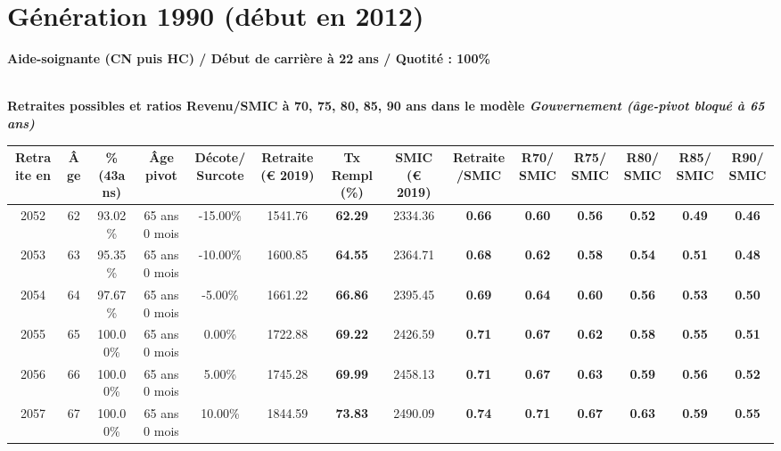 \newpage 
 
\section{Génération 1990 (début en 2012)\label{AideSoignant_100_1990_22_0}} 
 
{\bf \noindent Aide-soignante (CN puis HC) / Début de carrière à 22 ans / Quotité : 100\%}  ~ 

 ~\\{\bf \noindent Retraites possibles et ratios Revenu/SMIC à 70, 75, 80, 85, 90 ans dans le modèle \emph{Gouvernement (âge-pivot bloqué à 65 ans)}}  
 
\begin{adjustbox}{max width=\textwidth} 
\begin{tabular}[htb]{|c|c||c|c|c||c|c||c|c||c|c|c|c|c|} 
\hline 
 Retraite en &  Âge &  \%(43ans) &  Âge pivot &  Décote/Surcote &  Retraite (\euro{} 2019) &  Tx Rempl(\%) &  SMIC (\euro{} 2019) &  Retraite/SMIC &  R70/SMIC &  R75/SMIC &  R80/SMIC &  R85/SMIC &  R90/SMIC \\ 
\hline \hline 
 2052 &  62 &  93.02\% &  65 ans 0 mois &  -15.00\% &  1541.76 &  {\bf 62.29} &  2334.36 &  {\bf {\color{red} 0.66}} &  {\bf {\color{red} 0.60}} &  {\bf {\color{red} 0.56}} &  {\bf {\color{red} 0.52}} &  {\bf {\color{red} 0.49}} &  {\bf {\color{red} 0.46}} \\ 
\hline 
 2053 &  63 &  95.35\% &  65 ans 0 mois &  -10.00\% &  1600.85 &  {\bf 64.55} &  2364.71 &  {\bf {\color{red} 0.68}} &  {\bf {\color{red} 0.62}} &  {\bf {\color{red} 0.58}} &  {\bf {\color{red} 0.54}} &  {\bf {\color{red} 0.51}} &  {\bf {\color{red} 0.48}} \\ 
\hline 
 2054 &  64 &  97.67\% &  65 ans 0 mois &  -5.00\% &  1661.22 &  {\bf 66.86} &  2395.45 &  {\bf {\color{red} 0.69}} &  {\bf {\color{red} 0.64}} &  {\bf {\color{red} 0.60}} &  {\bf {\color{red} 0.56}} &  {\bf {\color{red} 0.53}} &  {\bf {\color{red} 0.50}} \\ 
\hline 
 2055 &  65 &  100.00\% &  65 ans 0 mois &  0.00\% &  1722.88 &  {\bf 69.22} &  2426.59 &  {\bf {\color{red} 0.71}} &  {\bf {\color{red} 0.67}} &  {\bf {\color{red} 0.62}} &  {\bf {\color{red} 0.58}} &  {\bf {\color{red} 0.55}} &  {\bf {\color{red} 0.51}} \\ 
\hline 
 2056 &  66 &  100.00\% &  65 ans 0 mois &  5.00\% &  1745.28 &  {\bf 69.99} &  2458.13 &  {\bf {\color{red} 0.71}} &  {\bf {\color{red} 0.67}} &  {\bf {\color{red} 0.63}} &  {\bf {\color{red} 0.59}} &  {\bf {\color{red} 0.56}} &  {\bf {\color{red} 0.52}} \\ 
\hline 
 2057 &  67 &  100.00\% &  65 ans 0 mois &  10.00\% &  1844.59 &  {\bf 73.83} &  2490.09 &  {\bf {\color{red} 0.74}} &  {\bf {\color{red} 0.71}} &  {\bf {\color{red} 0.67}} &  {\bf {\color{red} 0.63}} &  {\bf {\color{red} 0.59}} &  {\bf {\color{red} 0.55}} \\ 
\hline 
\hline 
\end{tabular} 
\end{adjustbox} 
 
